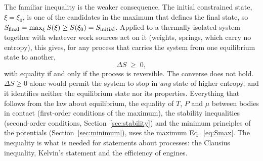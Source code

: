 \documentclass[10pt,a4paper]{article}
\theoremstyle{remark}
\begin{document}
The familiar inequality is the weaker consequence. The initial constrained state,
$\xi=\xi_0$, is one of the candidates in the maximum that defines the final
state, so $S_{\rm final}=\max_\xi S(\xi)\geq S(\xi_0)=S_{\rm initial}$. Applied
to a thermally isolated system together with whatever work sources act on it
(weights, springs, which carry no entropy), this gives, for any process that
carries the system from one equilibrium state to another,
\begin{equation}\label{eq:DeltaS}
  \Delta S\;\geq\;0 ,
\end{equation}
with equality if and only if the process is reversible. The converse does not
hold. $\Delta S\geq0$ alone would permit the system to stop in \emph{any} state of
higher entropy, and it identifies neither the equilibrium state nor its
properties. Everything that follows from the law about equilibrium, the
equality of $T$, $P$ and $\mu$ between bodies in contact (first-order
conditions of the maximum), the stability inequalities (second-order
conditions, Section~\ref{sec:stability}) and the minimum principles of the
potentials (Section~\ref{sec:minimum}), uses the maximum
Eq.~\eqref{eq:Smax}. The inequality is what is needed for statements about
processes: the Clausius inequality, Kelvin's statement and the efficiency of
engines.
\end{document}

